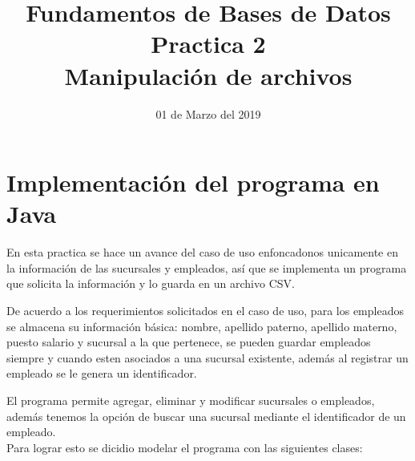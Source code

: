 \documentclass[10pt]{article}
\begin{document}
    \title{Fundamentos de Bases de Datos \\
        Practica 2\\ Manipulación de archivos
        } 
    \author{}
    \date{01 de Marzo del 2019}
    \maketitle
    
    \section{Implementación del programa en Java}\vspace{0.5cm}
    En esta practica se hace un avance del caso de uso enfoncadonos unicamente en la información de las sucursales y empleados, así que se implementa  un programa que solicita la información y lo guarda en un archivo CSV.
    
    De acuerdo a los requerimientos solicitados en el caso de uso, para los empleados se almacena su información básica: nombre, apellido paterno, apellido materno, puesto salario y sucursal a la que pertenece, se pueden guardar empleados siempre y cuando esten asociados a una sucursal existente, además al registrar un empleado se le genera  un identificador.
    
    El programa permite agregar, eliminar y modificar sucursales o empleados, además tenemos
    la opción de buscar una sucursal mediante el identificador de un empleado.\\
    
    
    Para lograr esto se dicidio modelar el programa con las siguientes clases:
    
\end{document}
